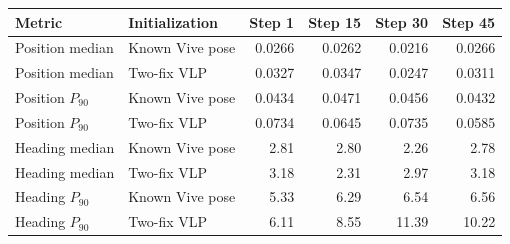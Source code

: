 \begin{tabular}{llrrrr}
\toprule
Metric & Initialization & Step 1 & Step 15 & Step 30 & Step 45 \\
\midrule
Position median & Known Vive pose & 0.0266 & 0.0262 & 0.0216 & 0.0266 \\
Position median & Two-fix VLP & 0.0327 & 0.0347 & 0.0247 & 0.0311 \\
Position $P_{90}$ & Known Vive pose & 0.0434 & 0.0471 & 0.0456 & 0.0432 \\
Position $P_{90}$ & Two-fix VLP & 0.0734 & 0.0645 & 0.0735 & 0.0585 \\
Heading median & Known Vive pose & 2.81 & 2.80 & 2.26 & 2.78 \\
Heading median & Two-fix VLP & 3.18 & 2.31 & 2.97 & 3.18 \\
Heading $P_{90}$ & Known Vive pose & 5.33 & 6.29 & 6.54 & 6.56 \\
Heading $P_{90}$ & Two-fix VLP & 6.11 & 8.55 & 11.39 & 10.22 \\
\bottomrule
\end{tabular}
